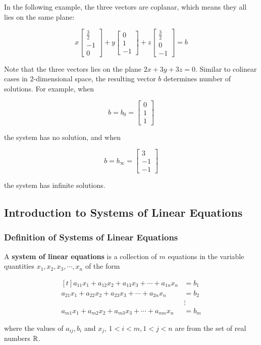 \documentclass[a4paper,12pt]{article}
\begin{document}
\begin{exm}
  In the following example, the three vectors are coplanar, which means they all lies on the same plane:

  $$x\begin{bmatrix}
    \frac{3}{2}\\
    -1\\
    0
  \end{bmatrix}+y\begin{bmatrix}
    0\\
    1\\
    -1
  \end{bmatrix}+z\begin{bmatrix}
    \frac{3}{2}\\
    0\\
    -1
  \end{bmatrix}=b$$\s

  Note that the three vectors lies on the plane $2x+3y+3z=0$. Similar to colinear cases in 2-dimensional space, the resulting vector $b$ determines number of solutions. For example, when

  $$b=b_{0}=\begin{bmatrix}
    0\\
    1\\
    1
  \end{bmatrix}$$\s

  the system has no solution, and when

  $$b=b_{\infty}=\begin{bmatrix}
    3\\
    -1\\
    -1
  \end{bmatrix}$$\s

  the system has infinite solutions.
\end{exm}

\propdisp

\subsection{Introduction to Systems of Linear Equations}
\subsubsection{Definition of Systems of Linear Equations}
\begin{dft}
  A \textbf{system of linear equations} is a collection of $m$ equations in the variable quantities $x_{1},x_{2},x_{3},\cdots,x_{n}$ of the form

  $$\begin{aligned}[t]
    a_{11}x_{1}+a_{12}x_{2}+a_{13}x_{3}+\cdots+a_{1n}x_{n}&=b_{1}\\
    a_{21}x_{1}+a_{22}x_{2}+a_{23}x_{3}+\cdots+a_{2n}x_{n}&=b_{2}\\
    &\vdots\\
    a_{m1}x_{1}+a_{m2}x_{2}+a_{m3}x_{3}+\cdots+a_{mn}x_{n}&=b_{m}
  \end{aligned}$$\s

  where the values of $a_{ij},b_{i}$ and $x_{j}$, $1<i<m,1<j<n$ are from the set of real numbers $\mathbb{R}$.
\end{dft}
\end{document}
